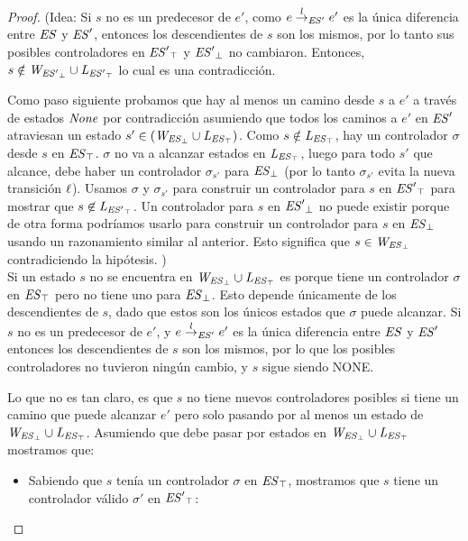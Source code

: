 \begin{proof}
	(Idea: Si $s$ no es un predecesor de $e'$, como $e \overset{l}{\rightarrow}_{\mathit{ES}'} e'$ es la única diferencia entre $\mathit{ES}$ y $\mathit{ES}'$, entonces los descendientes de $s$ son los mismos, 
	por lo tanto sus posibles controladores en $\mathit{{\mathit{ES}'}_{\top}}$ y
	$\mathit{{\mathit{ES}'}_{\bot}}$ no cambiaron. Entonces, $s \notin \mathit{W_{\mathit{{\mathit{ES}'}_{\bot}}}} \cup 
	\mathit{L_{\mathit{{\mathit{ES}'}_{\top}}}}$ lo cual es una contradicción.
	
	Como paso siguiente probamos que hay al menos un camino desde $s$ a $e'$ a través de estados $\mathit{None}$ por contradicción asumiendo que todos los caminos a $e'$ en $\mathit{ES}'$ atraviesan un estado $s' \in 
	(\mathit{W_{\mathit{{\mathit{ES}}_{\bot}}}} \cup \mathit{L_{\mathit{{\mathit{ES}}_{\top}}}})$. 
	Como $s \notin \mathit{L_{\mathit{{\mathit{ES}}_{\top}}}}$, hay un controlador $\sigma$ desde $s$ en $\mathit{{\mathit{ES}}_{\top}}$. $\sigma$ no va a alcanzar estados en $\mathit{L_{\mathit{{\mathit{ES}}_{\top}}}}$, luego para todo $s'$ que alcance, debe haber un controlador $\sigma_{s'}$ para $\mathit{{\mathit{ES}}_{\bot}}$ (por lo tanto $\sigma_{s'}$ evita la nueva transición $\ell$).
	Usamos $\sigma$ y $\sigma_{s'}$ para construir un controlador para $s$ en $\mathit{{\mathit{ES}'}_{\top}}$ para mostrar que $s 
	\not\in \mathit{L_{\mathit{{\mathit{ES}'}_{\top}}}}$.
	Un controlador para $s$ en $\mathit{{\mathit{ES}'}_{\bot}}$ no puede existir porque de otra forma podríamos usarlo para construir un controlador para $s$ en 
	$\mathit{{\mathit{ES}}_{\bot}}$ usando un razonamiento similar al anterior. Esto significa que $s \in 
	\mathit{W_{\mathit{{\mathit{ES}}_{\bot}}}}$ contradiciendo la hipótesis. )\\


Si un estado $s$ no se encuentra en $\mathit{W_{\mathit{{\mathit{ES}}_{\bot}}}} \cup \mathit{L_{\mathit{{\mathit{ES}}_{\top}}}}$ es porque tiene un controlador $\sigma$ en $\mathit{{\mathit{ES}}_{\top}}$ pero no tiene uno para $\mathit{{\mathit{ES}}_{\bot}}$. Esto depende únicamente de los descendientes de $s$, dado que estos son los únicos estados que $\sigma$ puede alcanzar. Si $s$ no es un predecesor de $e'$, y $e \overset{l}{\rightarrow}_{\mathit{ES}'} e'$ es la única diferencia entre $\mathit{ES}$ y $\mathit{ES}'$ entonces los descendientes de $s$ son los mismos, por lo que los posibles controladores no tuvieron ningún cambio, y $s$ sigue siendo NONE.

Lo que no es tan claro, es que $s$ no tiene nuevos controladores posibles si tiene un camino que puede alcanzar $e'$ pero solo pasando por al menos un estado de $\mathit{W_{\mathit{{\mathit{ES}}_{\bot}}}} \cup \mathit{L_{\mathit{{\mathit{ES}}_{\top}}}}$. Asumiendo que debe pasar por estados en $\mathit{W_{\mathit{{\mathit{ES}}_{\bot}}}} \cup \mathit{L_{\mathit{{\mathit{ES}}_{\top}}}}$ mostramos que:

\begin{itemize}
	\item Sabiendo que $s$ tenía un controlador $\sigma$ en $\mathit{{\mathit{ES}}_{\top}}$, mostramos que $s$ tiene un controlador válido $\sigma'$ en $\mathit{{\mathit{ES}'}_{\top}}$:
	

\end{itemize}
\end{proof}
